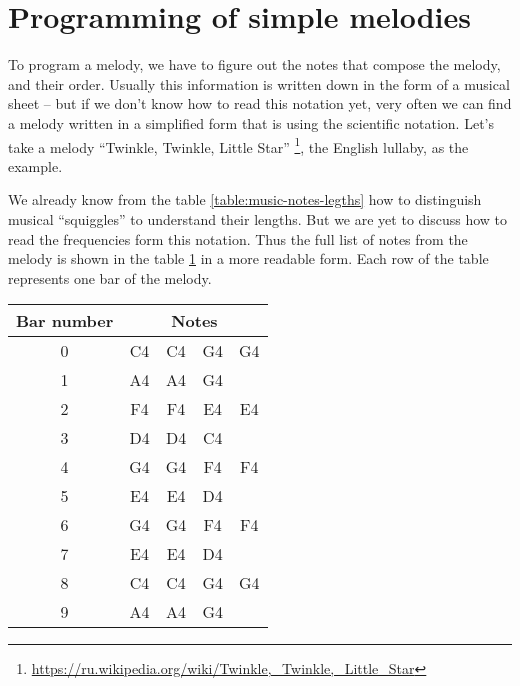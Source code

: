 \documentclass[../sparc.tex]{subfiles}
\begin{document}
\section{Programming of simple melodies}

To program a melody, we have to figure out the notes that compose the melody,
and their order.  Usually this information is written down in the form of a
musical sheet -- but if we don't know how to read this notation yet, very often
we can find a melody written in a simplified form that is using the scientific
notation.  Let's take a melody ``Twinkle, Twinkle, Little
Star'' \footnote{\url{https://ru.wikipedia.org/wiki/Twinkle,_Twinkle,_Little_Star}}, the English lullaby, as the example.


We already know from the table \ref{table:music-notes-legths} how to distinguish
musical ``squiggles'' to understand their lengths.  But we are yet to discuss
how to read the frequencies form this notation.  Thus the full list of notes
from the melody is shown in the table
\ref{table:twinkle-twinkle-little-star-notes} in a more readable form.  Each row
of the table represents one bar of the melody.

\begin{table}[ht]
  \centering
  \begin{tabular}{|*{5}{c|}}
    \hline
    \textbf{Bar number} & \multicolumn{4}{c|}{\textbf{Notes}} \\
    \hline
    0 & C4 & C4 & G4 & G4 \\
    \hline
    1 & A4 & A4 & G4 & \\
    \hline
    2 & F4 & F4 & E4 & E4 \\
    \hline
    3 & D4 & D4 & C4 & \\
    \hline
    4 & G4 & G4 & F4 & F4 \\
    \hline
    5 & E4 & E4 & D4 & \\
    \hline
    6 & G4 & G4 & F4 & F4 \\
    \hline
    7 & E4 & E4 & D4 & \\
    \hline
    8 & C4 & C4 & G4 & G4 \\
    \hline
    9 & A4 & A4 & G4 & \\
    \hline
  \end{tabular}
  \label{table:twinkle-twinkle-little-star-notes}
\end{table}
\end{document}
